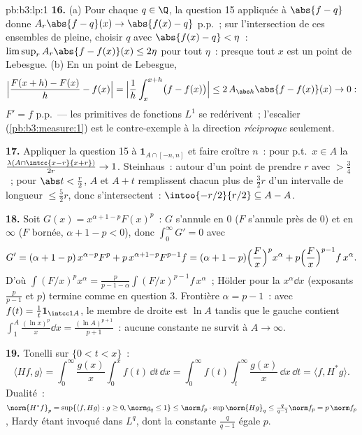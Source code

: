 \begin{solution}{pb:b3:lp:1}
\textbf{16.} (a) Pour chaque $q \in \Q$, la question 15
appliquée à $\abs{f - q}$ donne $A_r\abs{f - q}(x) \to
\abs{f(x) - q}$ p.p.~; sur l'intersection de ces ensembles
de  pleine, choisir $q$ avec $\abs{f(x) - q} <
\eta$~: $\limsup_rA_r\abs{f - f(x)}(x) \leq 2\eta$ pour
tout $\eta$~: presque tout $x$ est un point de Lebesgue.
(b) En un point de Lebesgue,
\[
\Bigl|\frac{F(x + h) - F(x)}h - f(x)\Bigr|
= \Bigl|\frac1h\int_x^{x+h}\bigl(f - f(x)\bigr)\Bigr|
\leq 2\,A_{\abs h}\abs{f - f(x)}(x) \to 0 :
\]
$F' = f$ p.p.\ --- les primitives de fonctions $L^1$ se
redérivent~; l'escalier (\cref{pb:b3:measure:1}) est le
contre-exemple à la direction \emph{réciproque} seulement.

\textbf{17.} Appliquer la question 15 à $\mathbf
1_{A\cap[-n,n]}$ et faire croître $n$~: pour p.t.\ $x \in
A$ la 
$\frac{\lambda(A\cap\intcc{x-r}{x+r})}{2r} \to 1$.
Steinhaus~: autour d'un point de  prendre $r$ avec
 $> \frac34$~; pour $\abs t < \frac r2$, $A$ et $A
+ t$ remplissent chacun plus de $\frac32r$ d'un intervalle
de longueur $\leq \frac52r$, donc s'intersectent~:
$\intoo{-r/2}{r/2} \subseteq A - A$.

\textbf{18.} Soit $G(x) = x^{\alpha+1-p}F(x)^p$~: $G$
s'annule en $0$ ($F$ s'annule près de $0$) et en $\infty$
($F$ bornée, $\alpha + 1 - p < 0$), donc $\int_0^\infty G'
= 0$ avec
\[
G' = (\alpha + 1 - p)\,x^{\alpha-p}F^p +
p\,x^{\alpha+1-p}F^{p-1}f
= (\alpha + 1 - p)\Bigl(\frac Fx\Bigr)^px^\alpha +
p\Bigl(\frac Fx\Bigr)^{p-1}f\,x^\alpha .
\]
D'où $\int(F/x)^px^\alpha = \frac{p}{p-1-\alpha}
\int(F/x)^{p-1}f\,x^\alpha$~; Hölder pour la 
$x^\alpha\dd x$ (exposants $\frac p{p-1}$ et $p$) termine
comme en question 3. Frontière $\alpha = p - 1$~: avec
$f(t) = \frac1t\mathbf 1_{\intcc1A}$, le membre de droite
est $\ln A$ tandis que le gauche contient
$\int_1^A\frac{(\ln x)^p}x\dd x = \frac{(\ln A)^{p+1}}{p+1}$~:
aucune constante ne survit à $A \to \infty$.

\textbf{19.} Tonelli sur $\{0 < t < x\}$~:
\[
\langle Hf, g\rangle =
\int_0^\infty\frac{g(x)}x\int_0^xf(t)\,\dd t\,\dd x
= \int_0^\infty f(t)\int_t^\infty\frac{g(x)}x\,\dd x\,\dd t
= \langle f, H^*g\rangle .
\]
Dualité~: $\norm{H^*f}_p = \sup\{\langle f, Hg\rangle : g
\geq 0, \norm g_q \leq 1\} \leq \norm f_p\cdot
\sup\norm{Hg}_q \leq \frac q{q-1}\norm f_p = p\,\norm f_p$,
Hardy étant invoqué dans $L^q$, dont la constante $\frac
q{q-1}$ égale $p$.


\end{solution}

